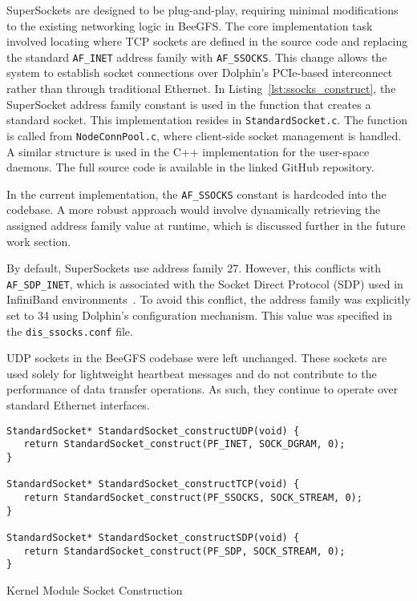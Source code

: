 SuperSockets are designed to be plug-and-play, requiring minimal modifications to the existing networking logic in BeeGFS. The core implementation task involved locating where TCP sockets are defined in the source code and replacing the standard \texttt{AF\_INET} address family with \texttt{AF\_SSOCKS}. This change allows the system to establish socket connections over Dolphin's PCIe-based interconnect rather than through traditional Ethernet. In Listing~\ref{lst:ssocks_construct}, the SuperSocket address family constant is used in the function that creates a standard socket. This implementation resides in \texttt{StandardSocket.c}. The function is called from \texttt{NodeConnPool.c}, where client-side socket management is handled. A similar structure is used in the C++ implementation for the user-space daemons. The full source code is available in the linked GitHub repository.

In the current implementation, the \texttt{AF\_SSOCKS} constant is hardcoded into the codebase. A more robust approach would involve dynamically retrieving the assigned address family value at runtime, which is discussed further in the future work section.

By default, SuperSockets use address family 27. However, this conflicts with \texttt{AF\_SDP\_INET}, which is associated with the Socket Direct Protocol (SDP) used in InfiniBand environments~\cite{goldenberg}. To avoid this conflict, the address family was explicitly set to 34 using Dolphin's configuration mechanism. This value was specified in the \texttt{dis\_ssocks.conf} file.

UDP sockets in the BeeGFS codebase were left unchanged. These sockets are used solely for lightweight heartbeat messages and do not contribute to the performance of data transfer operations. As such, they continue to operate over standard Ethernet interfaces.
 
\begin{listing}[H]
\begin{verbatim}
StandardSocket* StandardSocket_constructUDP(void) {
   return StandardSocket_construct(PF_INET, SOCK_DGRAM, 0);
}

StandardSocket* StandardSocket_constructTCP(void) {
   return StandardSocket_construct(PF_SSOCKS, SOCK_STREAM, 0);
}

StandardSocket* StandardSocket_constructSDP(void) {
   return StandardSocket_construct(PF_SDP, SOCK_STREAM, 0);
}
\end{verbatim}
\caption{Kernel Module Socket Construction}
\end{listing}

